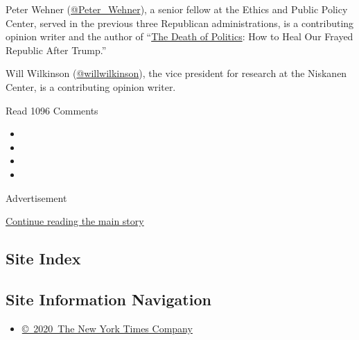 Peter Wehner
(\href{https://twitter.com/Peter_Wehner?ref_src=twsrc\%5Egoogle\%7Ctwcamp\%5Eserp\%7Ctwgr\%5Eauthor}{@Peter\_Wehner}),
a senior fellow at the Ethics and Public Policy Center, served in the
previous three Republican administrations, is a contributing opinion
writer and the author of
``\href{https://www.harpercollins.com/9780062820792/the-death-of-politics/}{The
Death of Politics}: How to Heal Our Frayed Republic After Trump.''

Will Wilkinson
(\href{https://twitter.com/willwilkinson}{@willwilkinson}), the vice
president for research at the Niskanen Center, is a contributing opinion
writer.

Read 1096 Comments

\begin{itemize}
\item
\item
\item
\item
\end{itemize}

Advertisement

\protect\hyperlink{after-bottom}{Continue reading the main story}

\hypertarget{site-index}{%
\subsection{Site Index}\label{site-index}}

\hypertarget{site-information-navigation}{%
\subsection{Site Information
Navigation}\label{site-information-navigation}}

\begin{itemize}
\tightlist
\item
  \href{https://help.nytimes3xbfgragh.onion/hc/en-us/articles/115014792127-Copyright-notice}{©~2020~The
  New York Times Company}
\end{itemize}

